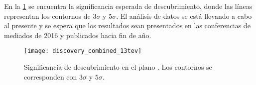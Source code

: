 En la \cref{fig:13tev_discovery} se encuentra la significancia esperada de descubrimiento,
donde las líneas representan los contornos de $3\sigma$ y $5\sigma$.
El análisis de datos se está llevando a cabo al presente y se espera que los resultados
sean presentados en las conferencias de mediados de 2016 y publicados hacia fin de a\~no.

\begin{figure}[!htb]
  \centering

  \texttt{[image: discovery\_combined\_13tev]}

  \caption{Significancia de descubrimiento en el plano \mgmn. Los contornos
    se corresponden con $3\sigma$ y $5\sigma$.}
  \label{fig:13tev_discovery}

\end{figure}
